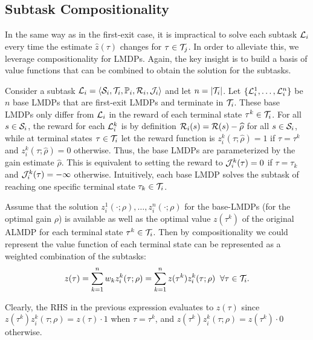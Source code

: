 \subsection{Subtask Compositionality}
In the same way as in the first-exit case, it is impractical to solve each subtask $\mathcal{L}_i$ every time the estimate $\widehat z(\tau)$ changes for $\tau\in\mathcal{T}_j$. In order to alleviate this, we leverage compositionality for LMDPs. Again, the key insight is to build a basis of value functions that can be combined to obtain the solution for the subtasks.

Consider a subtask $\mathcal{L}_i=\langle\mathcal{S}_i,\mathcal{T}_i,\mathbb{P}_i,\mathcal{R}_i,\mathcal{J}_i\rangle$ and let $n=|\mathcal{T}_i|$.  Let $\{\mathcal{L}_i^1,\ldots,\mathcal{L}_i^n\}$ be $n$ base LMDPs that are first-exit LMDPs and terminate in $\mathcal{T}_i$. These base LMDPs only differ from $\mathcal{L}_i$ in the reward of each terminal state $\tau^k\in\mathcal{T}_i$. For all $s\in\mathcal{S}_i$, the reward for each $\mathcal{L}_i^k$ is by definition $\mathcal{R}_i(s)=\mathcal{R}(s)-\widehat\rho$ for all $s\in\mathcal{S}_i$, while at terminal states $\tau\in\mathcal{T}_i$ let the reward function is $z_i^k(\tau;\widehat\rho)=1$ if $\tau=\tau^k$ and $z_i^k(\tau;\widehat\rho)=0$ otherwise. Thus, the base LMDPs are parameterized by the gain estimate $\widehat\rho$. This is equivalent to setting the reward to $\mathcal{J}_i^k(\tau)=0$ if $\tau=\tau_k$ and $\mathcal{J}_i^k(\tau)=-\infty$ otherwise. Intuitively, each base LMDP solves the subtask of reaching one specific terminal state $\tau_k\in\mathcal{T}_i$.

Assume that the solution $z_i^1(\cdot;\rho),\ldots,z_i^n(\cdot;\rho)$ for the base-LMDPs (for the optimal gain $\rho$) is available as well as the optimal value $z(\tau^k)$ of the original ALMDP for each terminal state $\tau^k\in\mathcal{T}_i$. Then by compositionality we could represent the value function of each terminal state can be represented as a weighted combination of the subtasks:
\begin{equation}
  z(\tau) = \sum_{k=1}^n w_k z_i^k(\tau;\rho) =  \sum_{k=1}^n z(\tau^k) z_i^k(\tau;\rho) \;\;\forall\tau\in\mathcal{T}_i.
  \label{eq:comp_terminal}
\end{equation}

Clearly, the RHS in the previous expression evaluates to $z(\tau)$ since $z(\tau^k) z_i^k(\tau;\rho) = z(\tau)\cdot 1$ when $\tau = \tau^k$, and
$z(\tau^k) z_i^k(\tau;\rho) = z(\tau^k)\cdot 0$ otherwise.

